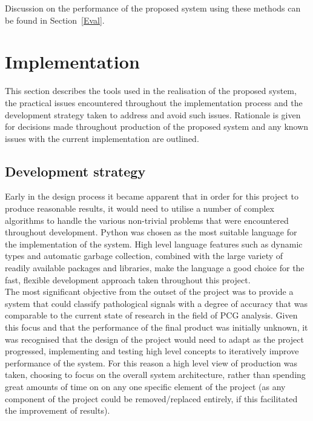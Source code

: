 \documentclass[titlepage, 12pt]{scrartcl} \usepackage{enumitem}
\begin{document}
Discussion on the performance of the proposed system using these methods can be
found in Section~\ref{Eval}.

\section{Implementation}
This section describes the tools used in the realisation of the
proposed system, the practical issues encountered throughout the
implementation process and the development strategy taken to address and avoid
such issues. Rationale is given for decisions made throughout
production of the proposed system and any known issues with the current implementation are
outlined.

\subsection{Development strategy}
Early in the design process it became apparent that in order for this project
to produce reasonable results, it would need to utilise a number of complex
algorithms to handle the various non-trivial problems that were encountered
throughout development. Python was chosen as the most suitable language for the
implementation of the system. High level language features such as dynamic
types and automatic garbage collection, combined with the large variety of
readily available packages and libraries, make the language a good choice for
the fast, flexible development approach taken throughout this project.\\

The most significant objective from the outset of the project was to provide a
system that could classify pathological signals with a degree of accuracy that
was comparable to the current state of research in the field of PCG analysis.
Given this focus and that the performance of the final product was initially
unknown, it was recognised that the design of the project would need to adapt
as the project progressed, implementing and testing high level concepts to
iteratively improve performance of the system. For this reason a high level
view of production was taken, choosing to focus on the overall system
architecture, rather than spending great amounts of time on on any one specific
element of the project (as any component of the project could be
removed/replaced entirely, if this facilitated the improvement of results).\\
\end{document}
